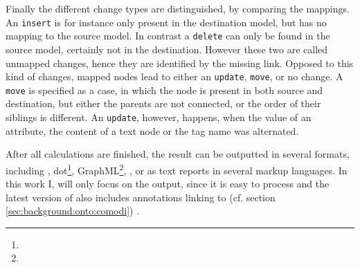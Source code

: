 	Finally the different change types are distinguished, by comparing the mappings. An \texttt{insert} is for instance only present in the destination model, but has no mapping to the source model. In contrast a \texttt{delete} can only be found in the source model, certainly not in the destination.
	However these two are called unmapped changes, hence they are identified by the missing link. Opposed to this kind of changes, mapped nodes lead to either an \texttt{update}, \texttt{move}, or no change.
	A \texttt{move} is specified as a case, in which the node is present in both source and destination, but either the parents are not connected, or the order of their siblings is different. An \texttt{update}, however, happens, when the value of an attribute, the content of a text node or the tag name was alternated.
	
	After all calculations are finished, the result can be outputted in several formats, including \xml, dot\footnote{}, GraphML\footnote{\todo{}}, \json, or as text reports in several markup languages.
	In this work I, will only focus on the \xml output, since it is easy to process and the latest version of \bives also includes \rdf annotations linking to \comodi (cf. section \ref{sec:background:onto:comodi}) \citep{Scharm2015}.
	
